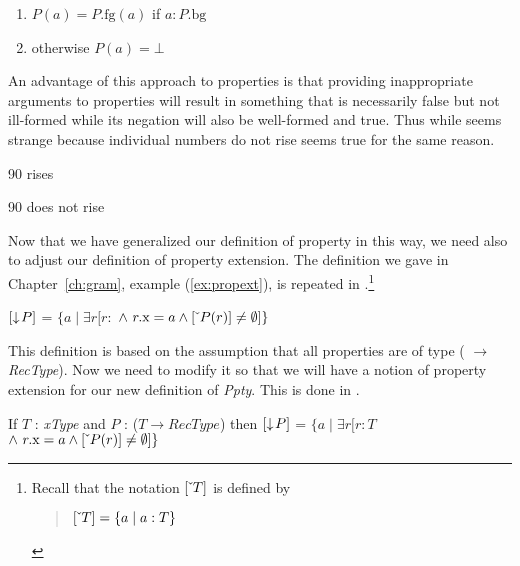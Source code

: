 \begin{shaded}
\begin{ex}
\begin{enumerate}
\item $P(a)=P.\text{fg}(a)$ if $a:P.\text{bg}$ 
 
\item otherwise $P(a)=\bot$ 
 
\end{enumerate} 
\label{ex:property-application}  
\end{ex} 

An advantage of this approach to properties is that providing
inappropriate arguments to properties will result in something that is
necessarily false but not ill-formed while its negation will also be
well-formed and true.  Thus while  seems strange because
individual numbers do not rise  seems true for the same reason.
\begin{ex} 
\begin{subex} 
 
\item 90 rises 
 
\item 90 does not rise 
 
\end{subex} 
   
\end{ex} 
  
\end{shaded}  


Now that we have generalized our definition of property in this way,
we need also to adjust our definition of property extension.  The definition we gave in
Chapter~\ref{ch:gram}, example (\ref{ex:propext}), is repeated in
\nexteg{}.\footnote{Recall that the notation $[\ \!\check{}\ \!T]$ is defined by
\begin{quote}  
$[\ \!\check{}\ \!T] = \{a\mid a:T\}$
\end{quote} 
}
\begin{ex} 
$[\downarrow\!P]$ = $\{a\mid\exists r[r:$
$\wedge\ r.\mathrm{x}=a\wedge\down{P(r)}\not=\emptyset]\}$ 
\end{ex} 
This definition is based on the assumption that all properties are of
type ( $\rightarrow$
\textit{RecType}).  Now we need to modify it so that we will have
a notion of property extension for our new definition of
\textit{Ppty}.  This is done in \nexteg{}.\label{pg:property-extension-rev}
\begin{ex} 
If $T$ : \textit{xType} and $P$ : ($T\rightarrow\textit{RecType}$) then $[\downarrow\!P]$ = $\{a\mid\exists r[r:T$
$\wedge\ r.\mathrm{x}=a\wedge\down{P(r)}\not=\emptyset]\}$  
\end{ex}

